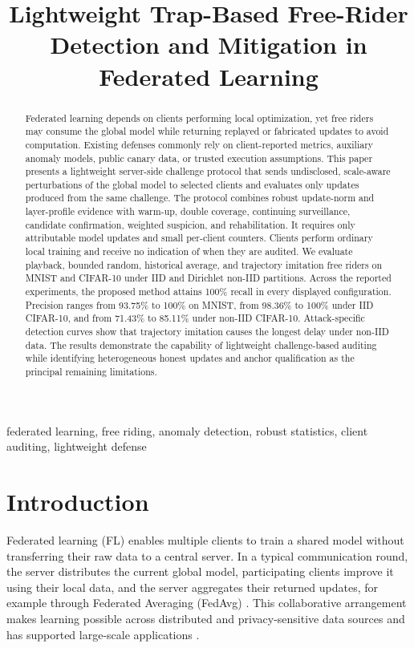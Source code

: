 \documentclass[conference]{IEEEtran}
\title{Lightweight Trap-Based Free-Rider Detection and Mitigation in Federated Learning}
\author{\IEEEauthorblockN{Aashnan Rahman}
\IEEEauthorblockA{Department of Computer Science and Engineering\\
Islamic University of Technology\\
MSc Thesis}}
\begin{document}
\maketitle
{}

\begin{abstract}
Federated learning depends on clients performing local optimization, yet free riders may consume the global model while returning replayed or fabricated updates to avoid computation. Existing defenses commonly rely on client-reported metrics, auxiliary anomaly models, public canary data, or trusted execution assumptions. This paper presents a lightweight server-side challenge protocol that sends undisclosed, scale-aware perturbations of the global model to selected clients and evaluates only updates produced from the same challenge. The protocol combines robust update-norm and layer-profile evidence with warm-up, double coverage, continuing surveillance, candidate confirmation, weighted suspicion, and rehabilitation. It requires only attributable model updates and small per-client counters. Clients perform ordinary local training and receive no indication of when they are audited. We evaluate playback, bounded random, historical average, and trajectory imitation free riders on MNIST and CIFAR-10 under IID and Dirichlet non-IID partitions. Across the reported experiments, the proposed method attains 100\% recall in every displayed configuration. Precision ranges from 93.75\% to 100\% on MNIST, from 98.36\% to 100\% under IID CIFAR-10, and from 71.43\% to 85.11\% under non-IID CIFAR-10. Attack-specific detection curves show that trajectory imitation causes the longest delay under non-IID data. The results demonstrate the capability of lightweight challenge-based auditing while identifying heterogeneous honest updates and anchor qualification as the principal remaining limitations.
\end{abstract}

\begin{IEEEkeywords}
federated learning, free riding, anomaly detection, robust statistics, client auditing, lightweight defense
\end{IEEEkeywords}

\section{Introduction}
Federated learning (FL) enables multiple clients to train a shared model without transferring their raw data to a central server. In a typical communication round, the server distributes the current global model, participating clients improve it using their local data, and the server aggregates their returned updates, for example through Federated Averaging (FedAvg) \cite{mcmahan2017communication}. This collaborative arrangement makes learning possible across distributed and privacy-sensitive data sources and has supported large-scale applications \cite{bonawitz2019towards,hard2018federated}.
\end{document}

